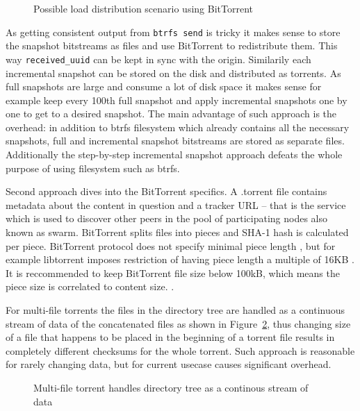 \documentclass[a4paper,11pt]{kth-mag}
\begin{document}
\begin{figure}[!htb]
\centering
\scalebox{0.5}{}
\caption{Possible load distribution scenario using BitTorrent}
\label{fig:butterknife-usecase-bittorrent}
\end{figure}


As getting consistent output from \lstinline!btrfs send!
is tricky it makes sense to store the snapshot
bitstreams as files and use BitTorrent to redistribute them.
This way \lstinline!received_uuid! can be kept in sync with the origin.
Similarily each incremental snapshot can be stored on the
disk and distributed as torrents.
As full snapshots are large and consume a lot
of disk space it makes sense for example
keep every 100th full snapshot and apply
incremental snapshots one by one to get
to a desired snapshot.
The main advantage of such approach is the overhead:
in addition to \acrshort{btrfs} filesystem which already
contains all the necessary snapshots,
full and incremental snapshot bitstreams
are stored as separate files.
Additionally the step-by-step incremental
snapshot approach defeats the whole
purpose of using filesystem such as \acrshort{btrfs}.

Second approach dives into the BitTorrent specifics.
A .torrent file contains metadata about the content in question and a
tracker URL -- that is the service which is used to discover other peers in the
pool of participating nodes also known as swarm.
BitTorrent splits files into pieces and SHA-1 hash is calculated per piece.
BitTorrent protocol does not specify minimal piece length
\cite{bep0003},
but for example libtorrent imposes restriction of having piece length
a multiple of 16KB
\cite{libtorrent-create-torrents}.
It is reccommended to keep BitTorrent file size below 100kB,
which means the piece size is correlated to content size.
\cite{torrent-piece-size}.


For multi-file torrents the files in the directory tree are handled
as a continuous stream of data of the concatenated files
as shown in Figure~\ref{fig:torrent-multifile},
thus changing size of a file that happens to be placed in the beginning of a torrent
file results in completely different checksums for the whole torrent.
Such approach is reasonable for rarely changing data, but for current usecase
causes significant overhead.

\begin{figure}[!htb]
\centering
\scalebox{0.35}{}
\caption{Multi-file torrent handles directory tree as a continous stream of data}
\label{fig:torrent-multifile}
\end{figure}
\end{document}
